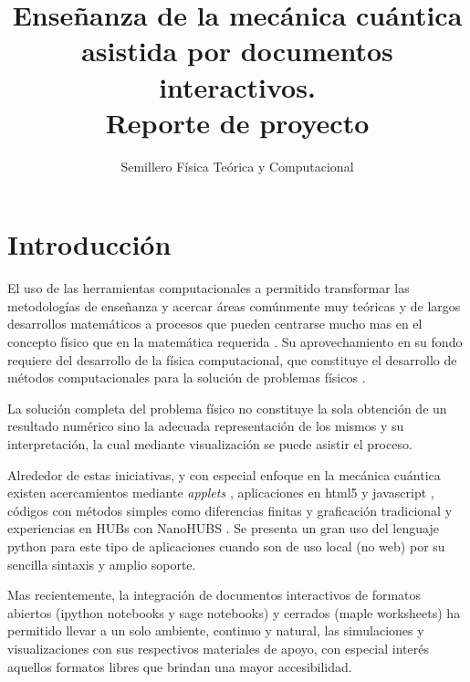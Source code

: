 \documentclass{article}
\title{Enseñanza de la mecánica cuántica asistida por documentos interactivos. \\ Reporte de proyecto}
\author{Semillero Física Teórica y Computacional}
\begin{document}
\maketitle


\section{Introducción}

El uso de las herramientas computacionales a permitido transformar las metodologías de enseñanza y acercar áreas comúnmente muy teóricas y de largos desarrollos matemáticos a procesos que pueden centrarse mucho mas en el concepto físico que en la matemática requerida \cite{Rojas2009, Landau2011}. Su aprovechamiento en su fondo requiere del desarrollo de la física computacional, que constituye el desarrollo de métodos computacionales para la solución de problemas físicos \cite{Rojas2009}.

La solución completa del problema físico no constituye la sola obtención de un resultado numérico sino la adecuada representación de los mismos y su interpretación, la cual mediante visualización se puede asistir el proceso.

Alrededor de estas iniciativas, y con especial enfoque en la mecánica cuántica existen acercamientos mediante \textit{applets} \cite{Belloni2015}, aplicaciones en html5 y javascript \cite{UCB2015}, códigos con métodos simples como diferencias finitas \cite{Garcia2007} y graficación tradicional y experiencias en HUBs con NanoHUBS \cite{Klimeck2007}. Se presenta un gran uso del lenguaje python para este tipo de aplicaciones cuando son de uso local (no web) \cite{Rojas2009, Landau2011} por su sencilla sintaxis y amplio soporte.

Mas recientemente, la integración de documentos interactivos de formatos abiertos (ipython notebooks y sage notebooks) \cite{Perez2013, Shen2014} y cerrados (maple worksheets) \cite{Horbatsch1995} ha permitido llevar a un solo ambiente, continuo y natural, las simulaciones y visualizaciones con sus respectivos materiales de apoyo, con especial interés aquellos formatos libres que brindan una mayor accesibilidad.
\end{document}
